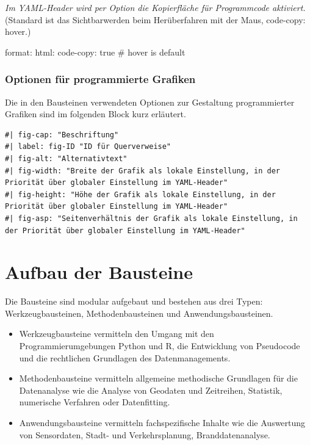 \documentclass[
  letterpaper,
  DIV=11]{scrartcl}
\newenvironment{Shaded}{\begin{snugshade}}{\end{snugshade}}
\newcommand{\NormalTok}[1]{\textcolor[rgb]{0.00,0.23,0.31}{#1}}
\begin{document}
\emph{Im YAML-Header wird per Option die Kopierfläche für Programmcode
aktiviert.} (Standard ist das Sichtbarwerden beim Herüberfahren mit der
Maus, code-copy: hover.)

\begin{Shaded}
\begin{Highlighting}[]
\NormalTok{format:}
\NormalTok{  html:}
\NormalTok{    code{-}copy: true \# hover is default}
\end{Highlighting}
\end{Shaded}

\subsubsection{Optionen für programmierte
Grafiken}\label{optionen-fuxfcr-programmierte-grafiken}

Die in den Bausteinen verwendeten Optionen zur Gestaltung programmierter
Grafiken sind im folgenden Block kurz erläutert.

\begin{verbatim}
#| fig-cap: "Beschriftung"
#| label: fig-ID "ID für Querverweise"
#| fig-alt: "Alternativtext"
#| fig-width: "Breite der Grafik als lokale Einstellung, in der Priorität über globaler Einstellung im YAML-Header"
#| fig-height: "Höhe der Grafik als lokale Einstellung, in der Priorität über globaler Einstellung im YAML-Header"
#| fig-asp: "Seitenverhältnis der Grafik als lokale Einstellung, in der Priorität über globaler Einstellung im YAML-Header"
\end{verbatim}

\section{Aufbau der Bausteine}\label{aufbau-der-bausteine}

Die Bausteine sind modular aufgebaut und bestehen aus drei Typen:
Werkzeugbausteinen, Methodenbausteinen und Anwendungsbausteinen.

\begin{itemize}
\item
  Werkzeugbausteine vermitteln den Umgang mit den Programmierumgebungen
  Python und R, die Entwicklung von Pseudocode und die rechtlichen
  Grundlagen des Datenmanagements.
\item
  Methodenbausteine vermitteln allgemeine methodische Grundlagen für die
  Datenanalyse wie die Analyse von Geodaten und Zeitreihen, Statistik,
  numerische Verfahren oder Datenfitting.
\item
  Anwendungsbausteine vermitteln fachspezifische Inhalte wie die
  Auswertung von Sensordaten, Stadt- und Verkehrsplanung,
  Branddatenanalyse.
\end{itemize}
\end{document}
